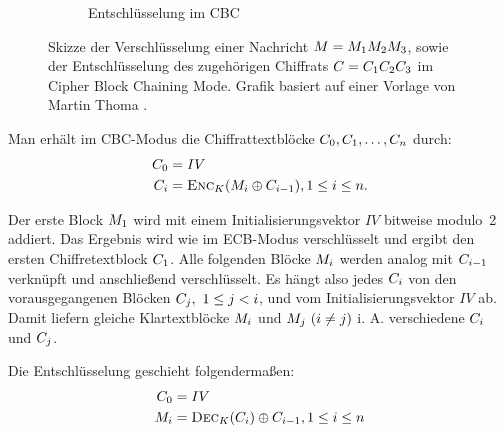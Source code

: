 \begin{figure}[h]
\begin{subfigure}[h]{.45\textwidth}
		\caption{Entschlüsselung im CBC}
	\end{subfigure}
	\caption{Skizze der Verschlüsselung einer Nachricht $M = M_1 M_2 M_3$, sowie der Entschlüsselung des zugehörigen Chiffrats $C = C_1 C_2 C_3$ im
	Cipher Block Chaining Mode. Grafik basiert auf einer Vorlage von Martin Thoma \cite{Thoma2013}.}
	\label{pc:cbc}
\end{figure}

Man erhält im CBC-Modus die Chiffrattextblöcke $C_0, C_1, \ldots, C_n$ durch:
\begin{align*}
	C_0 &= IV\\
	C_i &= \textsc{Enc}_{K}(M_i \oplus C_{i-1}){,}\, 1 \leq i \leq n.
\end{align*}

Der erste Block $M_1$ wird mit einem Initialisierungsvektor $IV$ bitweise modulo~2 addiert. Das Ergebnis wird wie im ECB-Modus verschlüsselt und ergibt den ersten Chiffretextblock $C_1$.
Alle folgenden Blöcke $M_i$ werden analog mit $C_{i-1}$ verknüpft und anschließend verschlüsselt. 
Es hängt also jedes $C_i$ von den vorausgegangenen Blöcken $C_j,\ 1\leq j<i$, und vom Initialisierungsvektor $IV$ ab. Damit
liefern gleiche Klartextblöcke $M_i$ und $M_j\ (i\neq j)$ i. A. verschiedene $C_i$ und $C_j$.

Die Entschlüsselung geschieht folgendermaßen:
\begin{align*}
	C_0 &= IV\\
	M_i &= \textsc{Dec}_{K}(C_i)\oplus C_{i-1}{,}\, 1 \leq i \leq n
\end{align*}

